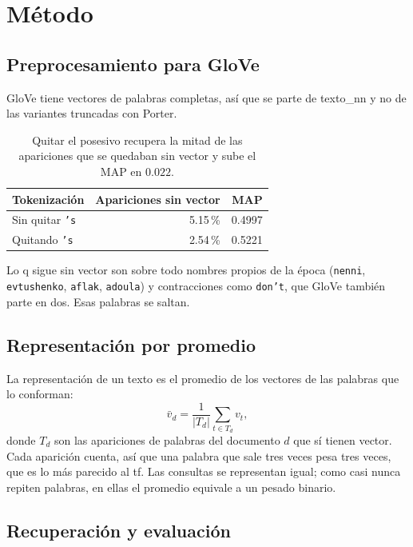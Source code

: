 \documentclass[11pt,letterpaper]{article}
\begin{document}
\section{Método}

\subsection*{Preprocesamiento para GloVe}

GloVe tiene vectores de palabras completas, así que se parte de
texto\_nn y no de las variantes truncadas con Porter.

\begin{table}[H]
  \centering
  \begin{tabular}{lrr}
    \toprule
    \textbf{Tokenización} & \textbf{Apariciones sin vector}
      & \textbf{MAP} \\
    \midrule
    Sin quitar \texttt{'s} & 5.15\,\% & 0.4997 \\
    Quitando \texttt{'s}   & 2.54\,\% & 0.5221 \\
    \bottomrule
  \end{tabular}
  \caption{Quitar el posesivo recupera la mitad de las apariciones que
    se quedaban sin vector y sube el MAP en $0.022$.}
  \label{tab:posesivo}
\end{table}

Lo q sigue sin vector son sobre todo nombres propios de la
época (\texttt{nenni}, \texttt{evtushenko}, \texttt{aflak},
\texttt{adoula}) y contracciones como \texttt{don't}, que GloVe
también parte en dos. Esas palabras se saltan.

\subsection*{Representación por promedio}

La representación de un texto es el promedio
de los vectores de las palabras que lo conforman:
\[
    \bar{v}_d = \frac{1}{|T_d|} \sum_{t \in T_d} v_t ,
\]
donde $T_d$ son las apariciones de palabras del documento $d$ que sí
tienen vector. Cada aparición cuenta, así que una palabra que sale
tres veces pesa tres veces, que es lo más parecido al tf. Las
consultas se representan igual; como casi nunca repiten palabras, en
ellas el promedio equivale a un pesado binario.

\subsection*{Recuperación y evaluación}
\end{document}
